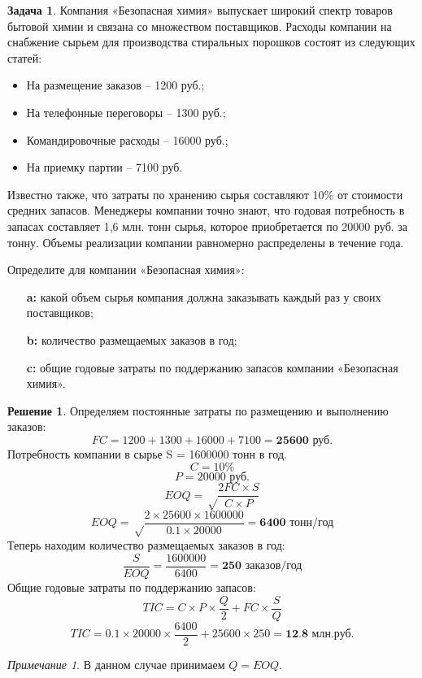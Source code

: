 \documentclass[a4paper, 14pt]{article}
\theoremstyle{plain} %
\theoremstyle{definition} %
\newtheorem*{solution}{Решение}
\newtheorem{problem}{Задача}[subsection]
\theoremstyle{remark} %
\newtheorem{nota}{Примечание}
\begin{document}
\begin{problem}
	Компания  «Безопасная  химия»  выпускает широкий  спектр  товаров  бытовой  химии  и  связана  со множеством поставщиков. Расходы компании на снабжение сырьем  для  производства  стиральных  порошков состоят  из следующих статей:
	\begin{itemize}
		\item На размещение заказов – 1200 руб.;
		\item На телефонные переговоры – 1300 руб.;
		\item Командировочные расходы – 16000 руб.;
		\item На приемку партии – 7100 руб.
	\end{itemize}

	Известно  также,  что  затраты  по  хранению  сырья составляют 10\% от стоимости средних запасов. Менеджеры компании  точно  знают,  что  годовая  потребность  в  запасах составляет 1,6 млн. тонн сырья, которое приобретается по 20000 руб.  за  тонну.  Объемы  реализации  компании  равномерно распределены в течение года.

	Определите для компании «Безопасная химия»:
	\begin{itemize}
		\item[\textbf{a:}] какой объем сырья компания должна заказывать каждый раз у своих поставщиков;
		\item[\textbf{b:}] количество размещаемых заказов в год;
		\item[\textbf{c:}] общие годовые затраты по поддержанию запасов компании «Безопасная химия».
	\end{itemize}
	\begin{solution}
		Определяем постоянные затраты по размещению и выполнению заказов:
		\[FC = 1200 + 1300 + 16000 + 7100 = \textbf{25600 руб.}\]
		Потребность компании в сырье S = 1600000 тонн в год.
		\[C = 10\%\]
		\[P = \text{20000 руб.}\]
		\[EOQ = \sqrt \frac{2FC \times S}{C\times P}\]
		\[EOQ = \sqrt \frac{2\times 25600 \times 1600000}{0.1\times 20000} = \textbf{6400 тонн/год}\]
		Теперь находим количество размещаемых заказов в год:
		\[ \frac{S}{EOQ} = \frac{1600000}{6400} = \textbf{250 заказов/год}\]
		Общие годовые затраты по поддержанию запасов:
		\[TIC = C \times P \times \frac{Q}{2} + FC \times \frac{S}{Q}\]
		\[TIC = 0.1 \times 20000 \times \frac{6400}{2} + 25600 \times 250 = \textbf{12.8 млн.руб.}\]
		\begin{nota}
			В данном случае принимаем $Q=EOQ$.
		\end{nota}
	\end{solution}
\end{problem}
\end{document}
